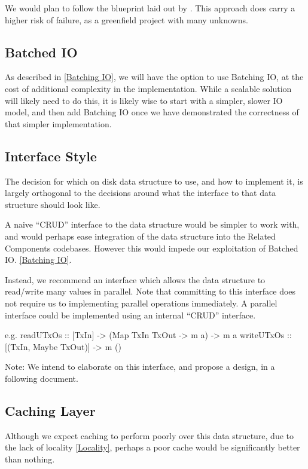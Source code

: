 \documentclass[11pt,a4paper]{article}
\begin{document}
We would plan to follow the blueprint laid out by \cite{monkey}. This approach
does carry a higher risk of failure, as a greenfield project with many unknowns.

\subsection{Batched IO}
As described in \ref{Batching IO}, we will have the option to use Batching IO,
at the cost of additional complexity in the implementation. While a scalable
solution will likely need to do this, it is likely wise to start with a simpler,
slower IO model, and then add Batching IO once we have demonstrated the
correctness of that simpler implementation.

\subsection{Interface Style}

The decision for which on disk data structure to use, and how to implement it,
is largely orthogonal to the decisions around what the interface to that data
structure should look like.

A naive ``CRUD'' interface to the data structure would be simpler to work with,
and would perhaps ease integration of the data structure into the Related Components
codebases. However this would impede our exploitation of Batched IO. \ref{Batching IO}.

Instead, we recommend an interface which allows the data structure to read/write
many values in parallel. Note that committing to this interface does not require
us to implementing parallel operations immediately. A parallel interface could
be implemented using an internal ``CRUD'' interface.

e.g.
readUTxOs :: [TxIn] -> (Map TxIn TxOut -> m a) -> m a
writeUTxOs :: [(TxIn, Maybe TxOut)] -> m ()


Note: We intend to elaborate on this interface, and propose a design, in a
following document.

\subsection{Caching Layer}
\label{Caching Layer}

Although we expect caching to perform poorly over this data structure, due to the
lack of locality \ref{Locality}, perhaps a poor cache would be significantly
better than nothing.
\end{document}
